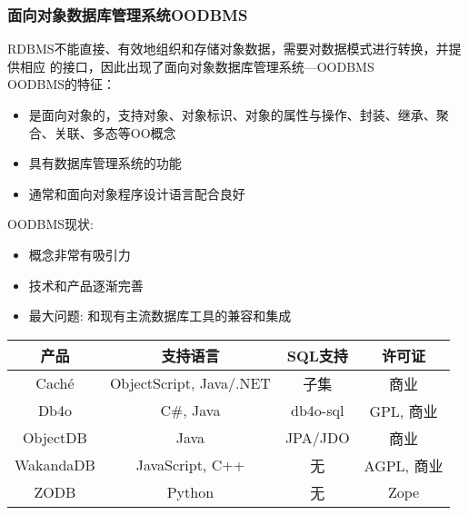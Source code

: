 \documentclass[compress]{beamer}
\begin{document}
\begin{frame}
  \frametitle{面向对象数据库管理系统OODBMS}
   {
  RDBMS不能直接、有效地组织和存储对象数据，需要对数据模式进行转换，并提供相应
  的接口，因此出现了面向对象数据库管理系统---OODBMS \\[2ex]

  OODBMS的特征：
  \begin{itemize}
    \item 是面向对象的，支持对象、对象标识、对象的属性与操作、封装、继承、聚合、关联、多态等OO概念
    \item 具有数据库管理系统的功能
    \item 通常和面向对象程序设计语言配合良好
  \end{itemize}
  }

   {
    OODBMS现状: 
    \begin{itemize}
      \item 概念非常有吸引力
      \item 技术和产品逐渐完善
      \item \alert{最大问题}: 和现有主流数据库工具的兼容和集成
    \end{itemize}
    \vspace*{1ex}

    {\small
    \noindent\begin{tabular}{|c|c|c|c|}
      \hline
      产品 & 支持语言 & SQL支持 & 许可证 \\ \hline \hline
      Cach\'{e} & ObjectScript, Java/.NET & 子集 & 商业 \\ \hline
      Db4o & C\#, Java & db4o-sql & GPL, 商业 \\ \hline
      ObjectDB & Java & JPA/JDO & 商业 \\ \hline
      WakandaDB & JavaScript, C++ & 无 & AGPL, 商业 \\ \hline
      ZODB & Python & 无 & Zope \\ \hline
    \end{tabular}
  }
  }

\end{frame}
\end{document}
